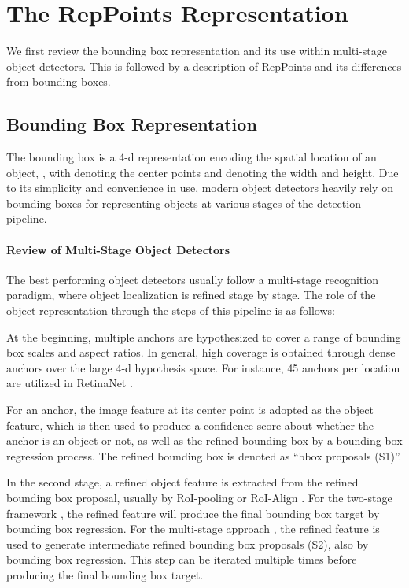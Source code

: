 \documentclass[10pt,twocolumn,letterpaper]{article}
\begin{document}
 
\vspace{-.5em}
\section{The RepPoints Representation}
We first review the bounding box representation and its use within multi-stage object detectors. This is followed by a description of RepPoints and its differences from bounding boxes.

\subsection{Bounding Box Representation}

\label{sec::bbox}

The bounding box is a 4-d representation encoding the spatial location of an object, , with  denoting the center points and  denoting the width and height. Due to its simplicity and convenience in use, modern object detectors heavily rely on bounding boxes for representing objects at various stages of the detection pipeline.

\vspace{-5pt}
\paragraph{Review of Multi-Stage Object Detectors} The best performing object detectors usually follow a multi-stage recognition paradigm, where object localization is refined stage by stage. The role of the object representation through the steps of this pipeline is as follows:


At the beginning, multiple anchors are hypothesized to cover a range of bounding box scales and aspect ratios. In general, high coverage is obtained through dense anchors over the large 4-d hypothesis space. For instance, 45 anchors per location are utilized in RetinaNet \cite{RetinaNet}. 

For an anchor, the image feature at its center point is adopted as the object feature, which is then used to produce a confidence score about whether the anchor is an object or not, as well as the refined bounding box by a bounding box regression process. The refined bounding box is denoted as ``bbox proposals (S1)''.

In the second stage, a refined object feature is extracted from the refined bounding box proposal, usually by RoI-pooling \cite{girshick2015fast} or RoI-Align \cite{Mask-rcnn}. For the two-stage framework \cite{ren2015faster}, the refined feature will produce the final bounding box target by bounding box regression. For the multi-stage approach \cite{Cascade-rcnn}, the refined feature is used to generate intermediate refined bounding box proposals (S2), also by bounding box regression. This step can be iterated multiple times before producing the final bounding box target.
\end{document}
